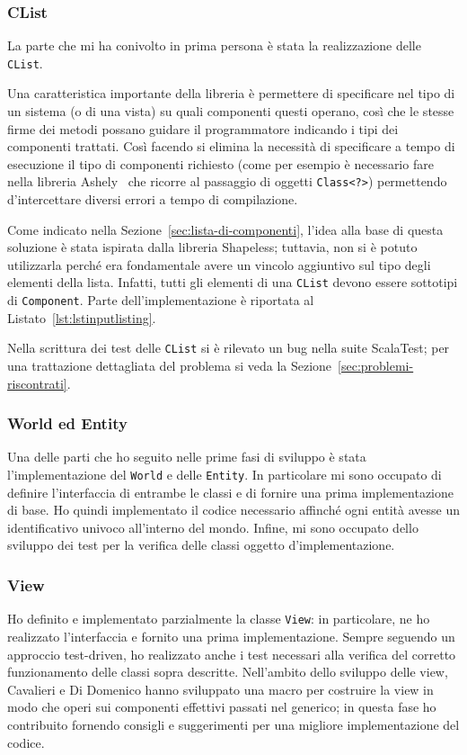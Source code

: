 \subsubsection{CList}
La parte che mi ha conivolto in prima persona è stata la realizzazione delle \texttt{CList}.

Una caratteristica importante della libreria è permettere di specificare nel tipo di un sistema (o di una vista)
su quali componenti questi operano, così che le stesse firme dei metodi possano guidare il programmatore indicando i
tipi dei componenti trattati.
Così facendo si elimina la necessità di specificare a tempo di esecuzione il tipo di componenti richiesto (come per
esempio è necessario fare nella libreria Ashely~\cite{ashley} che ricorre al passaggio di oggetti \texttt{Class<?>})
permettendo d'intercettare diversi errori a tempo di compilazione.

Come indicato nella Sezione~\ref{sec:lista-di-componenti}, l’idea alla base di questa soluzione è stata ispirata dalla
libreria Shapeless;
tuttavia, non si è potuto utilizzarla perché era fondamentale avere un vincolo aggiuntivo sul tipo degli
elementi della lista.
Infatti, tutti gli elementi di una \texttt{CList} devono essere sottotipi di \texttt{Component}.
Parte dell’implementazione è riportata al Listato~\ref{lst:lstinputlisting}.



Nella scrittura dei test delle \texttt{CList} si è rilevato un bug nella suite ScalaTest;
per una trattazione dettagliata del problema si veda la Sezione~\ref{sec:problemi-riscontrati}.

\subsubsection{World ed Entity}
Una delle parti che ho seguito nelle prime fasi di sviluppo è stata l'implementazione del \texttt{World} e delle
\texttt{Entity}.
In particolare mi sono occupato di definire l'interfaccia di entrambe le classi e di fornire una prima implementazione
di base.
Ho quindi implementato il codice necessario affinché ogni entità avesse un identificativo univoco all'interno del mondo.
Infine, mi sono occupato dello sviluppo dei test per la verifica delle classi oggetto d'implementazione.

\subsubsection{View}
Ho definito e implementato parzialmente la classe \texttt{View}: in particolare, ne ho realizzato l'interfaccia e
fornito una prima implementazione.
Sempre seguendo un approccio test-driven, ho realizzato anche i test necessari alla verifica del corretto funzionamento
delle classi sopra descritte.
Nell'ambito dello sviluppo delle view, Cavalieri e Di Domenico hanno sviluppato una macro per costruire la
view in modo che operi sui componenti effettivi passati nel generico;
in questa fase ho contribuito fornendo consigli e suggerimenti per una migliore implementazione del codice.

